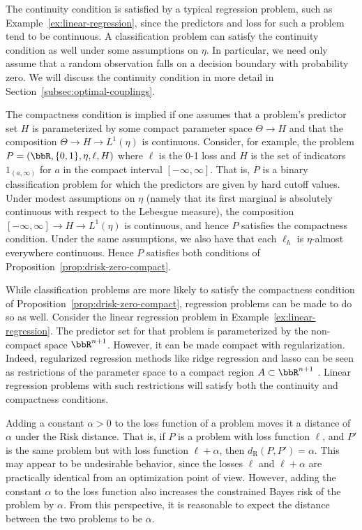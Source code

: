 \documentclass[twoside,11pt]{article}
\newcommand{\dexp}[1][]{d_{\mathrm{R}#1}}
\begin{document}
The continuity condition is satisfied by a typical regression problem, such as Example~\ref{ex:linear-regression}, since the predictors and loss for such a problem tend to be continuous. A classification problem can satisfy the continuity condition as well under some assumptions on $\eta$. In particular, we need only assume that a random observation falls on a decision boundary with probability zero. We will discuss the continuity condition in more detail in Section~\ref{subsec:optimal-couplings}.


The compactness condition is implied if one assumes that a problem's predictor set $H$ is parameterized by some compact parameter space $\Theta \to H$ and that the composition $\Theta \to H\to L^1(\eta)$ is continuous.
Consider, for example, the problem $P = (\bbR, \{0,1\}, \eta, \ell, H)$ where $\ell$ is the 0-1 loss and $H$ is the set of indicators $1_{(a,\infty)}$ for $a$ in the compact interval $[-\infty,\infty]$. That is, $P$ is a binary classification problem for which the predictors are given by hard cutoff values. Under modest assumptions on $\eta$ (namely that its first marginal is absolutely continuous with respect to the Lebesgue measure), the composition $[-\infty,\infty] \to H\to L^1(\eta)$ is continuous, and hence $P$ satisfies the compactness condition. Under the same assumptions, we also have that each $\ell_h$ is $\eta$-almost everywhere continuous. Hence $P$ satisfies both conditions of Proposition~\ref{prop:drisk-zero-compact}.

While classification problems are more likely to satisfy the compactness condition of Proposition~\ref{prop:drisk-zero-compact}, regression problems can be made to do so as well. Consider the linear regression problem in Example~\ref{ex:linear-regression}. The predictor set for that problem is parameterized by the non-compact space $\bbR^{n+1}$. However, it can be made compact with regularization. Indeed, regularized regression methods like ridge regression and lasso can be seen as restrictions of the parameter space to a compact region $A\subset \bbR^{n+1}$ \citep[Sec 6.2]{james_introduction_2021}. Linear regression problems with such restrictions will satisfy both the continuity and compactness conditions.






Adding a constant $\alpha>0$ to the loss function of a problem moves it a distance of $\alpha$ under the Risk distance. That is, if $P$ is a problem with loss function $\ell$, and $P'$ is the same problem but with loss function $\ell+\alpha$, then $\dexp(P,P')=\alpha$. This may appear to be undesirable behavior, since the losses $\ell$ and $\ell+\alpha$ are practically identical from an optimization point of view. However, adding the constant $\alpha$ to the loss function also increases the constrained Bayes risk of the problem by $\alpha$. From this perspective, it is reasonable to expect the distance between the two problems to be $\alpha$.
\end{document}

